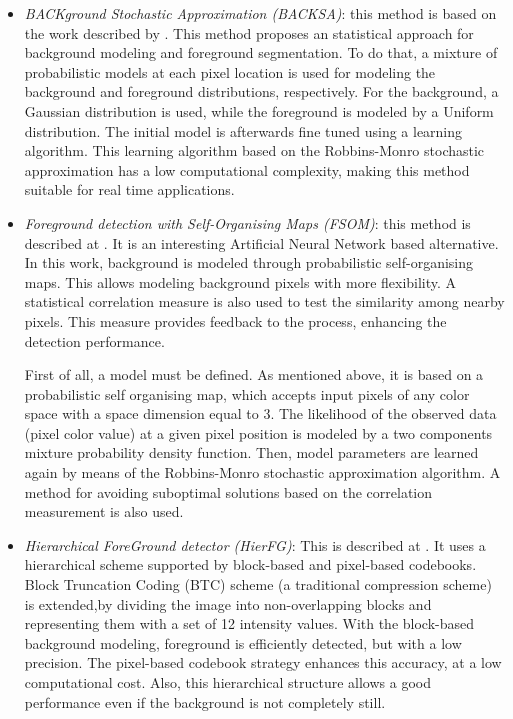 \begin{itemize}
\item \textit{BACKground Stochastic Approximation (BACKSA)}: this method is based on the work described by 
\cite{lopez2011stochastic}. This method proposes an statistical approach for background modeling and foreground 
segmentation. To do that, a mixture of probabilistic models at each pixel location is used for modeling the background and 
foreground distributions, respectively. For the background, a Gaussian distribution is used, while the foreground is 
modeled by a Uniform distribution. The initial model is afterwards fine tuned using a learning algorithm. This 
learning algorithm based on the Robbins-Monro stochastic approximation has a low computational complexity, making this method suitable for real time applications.
\item \textit{Foreground detection with Self-Organising Maps (FSOM)}: this method is described at 
\cite{lopez2011foreground}. It is an interesting Artificial Neural Network based alternative. In this 
work, background is modeled through probabilistic self-organising maps. This allows modeling background pixels with 
more flexibility. A statistical correlation measure is also used to test the similarity among nearby pixels. This 
measure provides feedback to the process, enhancing the detection performance.

First of all, a model must be defined. As mentioned above, it is based on a probabilistic self organising map, which 
accepts input pixels of any color space with a space dimension equal to 3. The likelihood of the observed data (pixel 
color value) at a given pixel position is modeled by a two components mixture probability density function.
Then, model parameters are learned again by means of the Robbins-Monro stochastic approximation algorithm. A method for avoiding 
suboptimal solutions based on the correlation measurement is also used.
\item \textit{Hierarchical ForeGround detector (HierFG)}: This is described at \cite{guo2011hierarchical}. It uses a 
hierarchical scheme supported by block-based and pixel-based codebooks. Block Truncation Coding (BTC) scheme (a 
traditional compression scheme) is extended,by dividing the image into non-overlapping blocks and representing them with 
a set of 12 intensity values. With the block-based background modeling, foreground is efficiently detected, but with a 
low precision. The pixel-based codebook strategy enhances this accuracy, at a low computational cost. Also, 
this hierarchical structure allows a good performance even if the background is not completely still.


\end{itemize}
